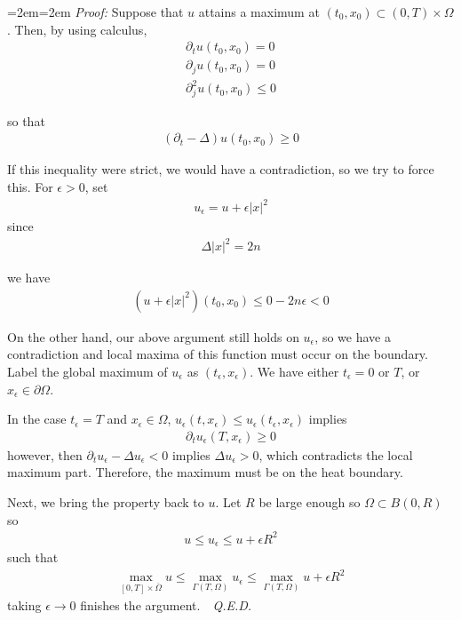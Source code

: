 \documentclass{article}
\newcommand{\cl}[1]{{\overline{#1}}}
\newcommand{\pd}{\partial}
\newenvironment{pf}{%
	\par%
	\medskip
	\leftskip=2em\rightskip=2em%
	\noindent\ignorespaces \textit{Proof:} \newline}{%
	\,\, \newline \textit{Q.E.D.}\par\medskip}
\begin{document}
	\begin{pf}
		Suppose that $u$ attains a maximum at $(t_0,x_0) \subset (0,T) \times \Omega$. Then, by using calculus, 
		\begin{align*}
			\pd_{t}u (t_0,x_0) = 0 \\
			\pd_{j} u(t_0,x_0) = 0 \\
			\pd_{j}^{2} u(t_0,x_0) \leq 0
		\end{align*}
		
		so that 
		\begin{align*}
			(\pd_{t} - \Delta) u(t_0,x_0) \geq 0
		\end{align*}
		
		If this inequality were strict, we would have a contradiction, so we try to force this. For $\epsilon > 0$, set 
		\begin{align*}
			u_{\epsilon} = u + \epsilon |x|^{2}
		\end{align*}
		since 
		\begin{align*}
			\Delta |x|^{2} = 2n
		\end{align*}
		
		we have 
		\begin{align*}
			[\pd_{t} - \Delta] (u+\epsilon |x|^{2})(t_0,x_0) \leq 0 - 2n\epsilon < 0
		\end{align*}
		
		On the other hand, our above argument still holds on $u_{\epsilon}$, so we have a contradiction and local maxima of this function must occur on the boundary. Label the global maximum of $u_{\epsilon}$ as $(t_{\epsilon},x_{\epsilon})$. We have either $t_{\epsilon} = 0$ or $T$, or $x_{\epsilon} \in \pd \Omega$. 
		
		In the case $t_{\epsilon} = T$ and $x_{\epsilon} \in \Omega$, $u_{\epsilon}(t,x_{\epsilon}) \leq u_{\epsilon}(t_{\epsilon},x_{\epsilon})$ implies 
		\begin{align*}
			\pd_{t} u_{\epsilon}(T,x_\epsilon) \geq 0
		\end{align*}
		however, then $\pd_{t} u_{\epsilon} - \Delta u_{\epsilon} < 0$ implies $\Delta u_{\epsilon} > 0$, which contradicts the local maximum part. Therefore, the maximum must be on the heat boundary. 
		
		Next, we bring the property back to $u$. Let $R$ be large enough so $\Omega \subset B(0,R)$ so 
		\begin{align*}
			u \leq u_{\epsilon} \leq u + \epsilon R^{2}
		\end{align*}
		such that 
		\begin{align*}
			\max_{[0,T] \times \cl{\Omega}} u \leq \max_{\Gamma(T,\Omega)} u_{\epsilon} \leq \max_{\Gamma(T,\Omega)} u + \epsilon R^{2}
		\end{align*}
		taking $\epsilon \to 0$ finishes the argument. 
	\end{pf}
	
\end{document}
